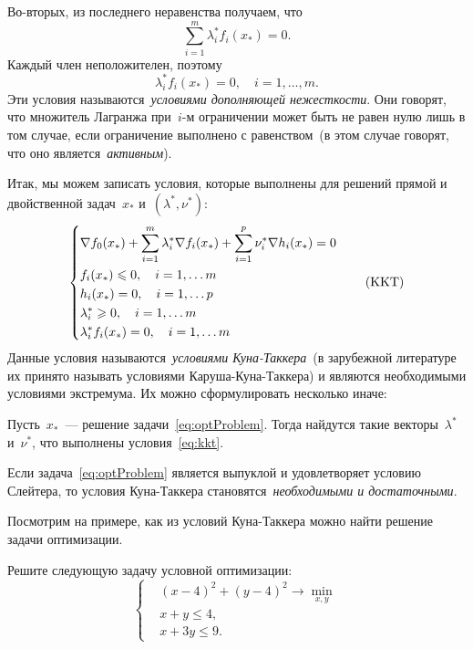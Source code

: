 \documentclass[12pt,fleqn]{article}
\begin{document}
Во-вторых, из последнего неравенства получаем, что
\[
\sum_{i = 1}^{m} \lambda_i^* f_i(x_*) = 0.
\]
Каждый член неположителен, поэтому
\[
\lambda_i^* f_i(x_*) = 0, \quad i = 1, \dots, m.
\]
Эти условия называются~\emph{условиями дополняющей нежесткости}.
Они говорят, что множитель Лагранжа при~$i$-м ограничении
может быть не равен нулю лишь в том случае, если
ограничение выполнено с равенством~(в этом случае говорят,
что оно является~\emph{активным}).

Итак, мы можем записать условия, которые выполнены
для решений прямой и двойственной задач~$x_*$ и~$(\lambda^*, \nu^*)$:
\begin{equation}
\label{eq:kkt}
    \left\{
        \begin{aligned}
            & \nabla f_0(x_*)
                +
                \sum_{i = 1}^{m} \lambda_i^* \nabla f_i(x_*)
                +
                \sum_{i = 1}^{p} \nu_i^* \nabla h_i(x_*) = 0 \\
            & f_i(x_*) \leq 0, \quad i = 1, \dots m \\
            & h_i(x_*) = 0, \quad i = 1, \dots p \\
            & \lambda_i^* \geq 0, \quad i = 1, \dots m \\
            & \lambda_i^* f_i(x_*) = 0, \quad i = 1, \dots m
        \end{aligned}
    \right.
    \tag{$\text{KKT}$}
\end{equation}
Данные условия называются~\emph{условиями Куна-Таккера}~(в зарубежной
литературе их принято называть условиями Каруша-Куна-Таккера)
и являются необходимыми условиями экстремума.
Их можно сформулировать несколько иначе:
\begin{vkTheorem}
    Пусть~$x_*$~--- решение задачи~\eqref{eq:optProblem}.
    Тогда найдутся такие векторы~$\lambda^*$ и~$\nu^*$,
    что выполнены условия~\eqref{eq:kkt}.
\end{vkTheorem}

Если задача~\eqref{eq:optProblem} является выпуклой и удовлетворяет условию Слейтера,
то условия Куна-Таккера становятся~\emph{необходимыми и достаточными}.

Посмотрим на примере, как из условий Куна-Таккера можно найти
решение задачи оптимизации.

\begin{vkProblem}
    Решите следующую задачу условной оптимизации:
    \[
        \left\{
            \begin{aligned}
                & (x-4)^2 + (y-4)^2 \to \min_{x, y} \\
                & x+y \leq 4, \\
                & x+3y \leq 9.
            \end{aligned}
        \right.
    \]
\end{vkProblem}
\end{document}
